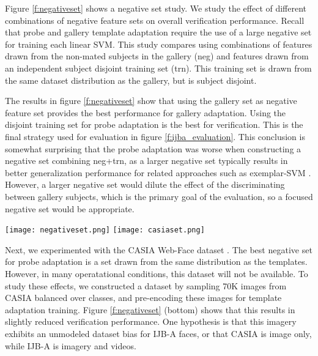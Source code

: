 \documentclass[10pt,twocolumn,letterpaper]{article}
\theoremstyle{definition}		\newtheorem{defn}[thm]{Definition}
\newcommand{\figwidth}{6.85in}
\begin{document}
Figure \ref{f:negativeset} shows a negative set study.  We study the effect of different combinations of negative feature sets on overall verification performance.  Recall that probe and gallery template adaptation require the use of a large negative set for training each linear SVM.  This study compares using combinations of features drawn from the non-mated subjects in the gallery (neg) and features drawn from an independent subject disjoint training set (trn). This training set is drawn from the same dataset distribution as the gallery, but is subject disjoint.  

The results in figure \ref{f:negativeset} show that using the gallery set as negative feature set provides the best performance for gallery adaptation.  Using the disjoint training set for probe adaptation is the best for verification.  This is the final strategy used for evaluation in figure \ref{f:ijba_evaluation}.  This conclusion is somewhat surprising that the probe adaptation was worse when constructing a negative set combining neg+trn, as a larger negative set typically results in better generalization performance for related approaches such as  exemplar-SVM \cite{Malisiewicz11}.  However, a larger negative set would dilute the effect of the discriminating between gallery subjects, which is the primary goal of the evaluation, so a focused negative set would be appropriate.


\ifdefined\ECCV
\begin{figure*}[!t]
\begin{centering}
\texttt{[image: negativeset.png]} 
\texttt{[image: casiaset.png]} 
\caption{Negative Set Analysis.  We compare the effect of different negative sets for template adaptation.  (top) The best choice is using the other non-mated gallery templates to define the negative set.  (bottom) Experiments with a large unrelated negative set based on CASIA WebFaces results in slightly lowered performance.}
\label{f:negativeset}
\end{centering}
\end{figure*}
 \fi

Next, we experimented with the CASIA Web-Face dataset \cite{Yi14}.  The best negative set for probe adaptation is a set drawn from the same distribution as the templates.  However, in many operatational conditions, this dataset will not be available. 
To study these effects, 
we constructed a dataset by sampling 70K images from CASIA balanced over classes, and pre-encoding these images for template adaptation training.  Figure \ref{f:negativeset} (bottom) shows that this results in slightly reduced verification performance.  One hypothesis is that this imagery exhibits an unmodeled dataset bias for IJB-A faces, or that CASIA is image only, while IJB-A is imagery and videos. 
\end{document}
